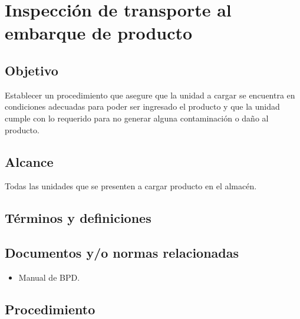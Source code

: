 \renewcommand{\MayorVer}{2}
\renewcommand{\MenorVer}{1}
\renewcommand{\Codigo}{PSA-10-PRO} %
\renewcommand{\FechaPub}{2023--01}
\renewcommand{\Titulo}{Inspección de transporte al embarque de producto}

\section{\Titulo}

\subsection{Objetivo}
Establecer un procedimiento que asegure que la unidad a cargar se encuentra en condiciones adecuadas para poder ser ingresado el producto y que la unidad cumple con lo requerido para no generar alguna contaminación o daño al producto.

\subsection{Alcance}
Todas las unidades que se presenten a cargar producto en el almacén.

\subsection{Términos y definiciones}
\begin{description}
\end{description}

\subsection{Documentos y/o normas relacionadas}
	\begin{itemize}
		\item Manual de \gls{BPD}.
	\end{itemize}

\subsection{Procedimiento}


